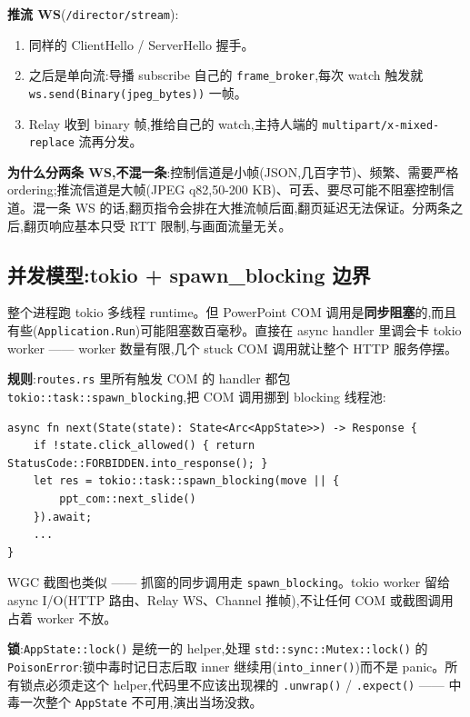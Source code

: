\textbf{推流 WS}(\texttt{/director/stream}):

\begin{enumerate}
  \item 同样的 ClientHello / ServerHello 握手。
  \item 之后是单向流:导播 subscribe 自己的 \texttt{frame\_broker},每次 watch 触发就 \texttt{ws.send(Binary(jpeg\_bytes))} 一帧。
  \item Relay 收到 binary 帧,推给自己的 watch,主持人端的 \texttt{multipart/x-mixed-replace} 流再分发。
\end{enumerate}

\textbf{为什么分两条 WS,不混一条}:控制信道是小帧(JSON,几百字节)、频繁、需要严格 ordering;推流信道是大帧(JPEG q82,50-200 KB)、可丢、要尽可能不阻塞控制信道。混一条 WS 的话,翻页指令会排在大推流帧后面,翻页延迟无法保证。分两条之后,翻页响应基本只受 RTT 限制,与画面流量无关。

\subsection{并发模型:tokio + spawn\_blocking 边界}

整个进程跑 tokio 多线程 runtime。但 PowerPoint COM 调用是\textbf{同步阻塞}的,而且有些(\texttt{Application.Run})可能阻塞数百毫秒。直接在 async handler 里调会卡 tokio worker —— worker 数量有限,几个 stuck COM 调用就让整个 HTTP 服务停摆。

\textbf{规则}:\texttt{routes.rs} 里所有触发 COM 的 handler 都包 \texttt{tokio::task::spawn\_blocking},把 COM 调用挪到 blocking 线程池:

\begin{lstlisting}
async fn next(State(state): State<Arc<AppState>>) -> Response {
    if !state.click_allowed() { return StatusCode::FORBIDDEN.into_response(); }
    let res = tokio::task::spawn_blocking(move || {
        ppt_com::next_slide()
    }).await;
    ...
}
\end{lstlisting}

WGC 截图也类似 —— 抓窗的同步调用走 \texttt{spawn\_blocking}。tokio worker 留给 async I/O(HTTP 路由、Relay WS、Channel 推帧),不让任何 COM 或截图调用占着 worker 不放。

\textbf{锁}:\texttt{AppState::lock()} 是统一的 helper,处理 \texttt{std::sync::Mutex::lock()} 的 \texttt{PoisonError}:锁中毒时记日志后取 inner 继续用(\texttt{into\_inner()})而不是 panic。所有锁点必须走这个 helper,代码里不应该出现裸的 \texttt{.unwrap()} / \texttt{.expect()} —— 中毒一次整个 \texttt{AppState} 不可用,演出当场没救。

